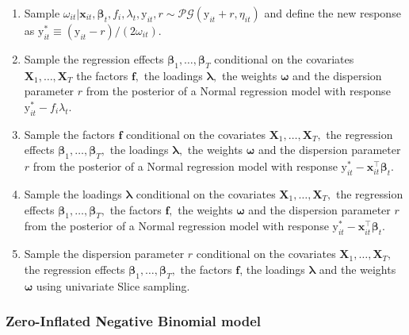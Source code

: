 \documentclass[a4paper, preprint, 3p,
authoryear]{elsarticle} %
\begin{document}
\begin{enumerate}
    \item Sample $\omega_{it}|\textbf{x}_{it},\boldsymbol{\beta}_t,f_i,\lambda_t,\text{y}_{it}, r \sim \mathcal{PG}(\text{y}_{it}+r, \eta_{it})$ and define the new response as $\text{y}_{it}^* \equiv (\text{y}_{it}-r)/(2\omega_{it})$.
    \item Sample the regression effects $\boldsymbol{\beta}_1,\dots,\boldsymbol{\beta}_T$ conditional on the covariates $\textbf{X}_1,\dots,\textbf{X}_T$ the factors $\mathbf{f},$ the loadings $\boldsymbol{\lambda},$ the weights $\boldsymbol{\omega}$ and the dispersion parameter $r$ from the posterior of a Normal regression model with response $\text{y}_{it}^*-f_i\lambda_t.$
    \item Sample the factors $\mathbf{f}$ conditional on the covariates $\textbf{X}_1,\dots,\textbf{X}_T,$ the regression effects $\boldsymbol{\beta}_1,\dots,\boldsymbol{\beta}_T,$ the loadings $\boldsymbol{\lambda},$ the weights $\boldsymbol{\omega}$ and the dispersion parameter $r$ from the posterior of a Normal regression model with response  $\text{y}_{it}^*-\textbf{x}_{it}^\top \boldsymbol{\beta}_t$.
    \item Sample the loadings $\boldsymbol{\lambda}$ conditional on the covariates $\textbf{X}_1,\dots,\textbf{X}_T,$ the regression effects $\boldsymbol{\beta}_1,\dots,\boldsymbol{\beta}_T,$ the factors $\mathbf{f},$ the weights $\boldsymbol{\omega}$ and the dispersion parameter $r$ from the posterior of a Normal regression model with response  $\text{y}_{it}^*-\textbf{x}_{it}^\top \boldsymbol{\beta}_t.$
    \item Sample the dispersion parameter $r$ conditional on the covariates $\textbf{X}_1,\dots,\textbf{X}_T,$ the regression effects $\boldsymbol{\beta}_1,\dots,\boldsymbol{\beta}_T,$ the factors $\mathbf{f}$, the loadings $\boldsymbol{\lambda}$ and the weights $\boldsymbol{\omega}$ using univariate Slice sampling. 
\end{enumerate}

\subsubsection{Zero-Inflated Negative Binomial
model}\label{zero-inflated-negative-binomial-model-1}
\end{document}
